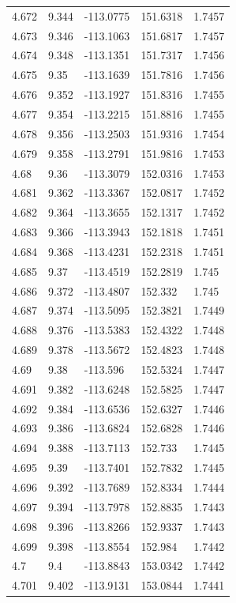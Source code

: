\begin{tabular}{lllll}
4.672 & 9.344 & -113.0775 & 151.6318 & 1.7457 \\
4.673 & 9.346 & -113.1063 & 151.6817 & 1.7457 \\
4.674 & 9.348 & -113.1351 & 151.7317 & 1.7456 \\
4.675 & 9.35 & -113.1639 & 151.7816 & 1.7456 \\
4.676 & 9.352 & -113.1927 & 151.8316 & 1.7455 \\
4.677 & 9.354 & -113.2215 & 151.8816 & 1.7455 \\
4.678 & 9.356 & -113.2503 & 151.9316 & 1.7454 \\
4.679 & 9.358 & -113.2791 & 151.9816 & 1.7453 \\
4.68 & 9.36 & -113.3079 & 152.0316 & 1.7453 \\
4.681 & 9.362 & -113.3367 & 152.0817 & 1.7452 \\
4.682 & 9.364 & -113.3655 & 152.1317 & 1.7452 \\
4.683 & 9.366 & -113.3943 & 152.1818 & 1.7451 \\
4.684 & 9.368 & -113.4231 & 152.2318 & 1.7451 \\
4.685 & 9.37 & -113.4519 & 152.2819 & 1.745 \\
4.686 & 9.372 & -113.4807 & 152.332 & 1.745 \\
4.687 & 9.374 & -113.5095 & 152.3821 & 1.7449 \\
4.688 & 9.376 & -113.5383 & 152.4322 & 1.7448 \\
4.689 & 9.378 & -113.5672 & 152.4823 & 1.7448 \\
4.69 & 9.38 & -113.596 & 152.5324 & 1.7447 \\
4.691 & 9.382 & -113.6248 & 152.5825 & 1.7447 \\
4.692 & 9.384 & -113.6536 & 152.6327 & 1.7446 \\
4.693 & 9.386 & -113.6824 & 152.6828 & 1.7446 \\
4.694 & 9.388 & -113.7113 & 152.733 & 1.7445 \\
4.695 & 9.39 & -113.7401 & 152.7832 & 1.7445 \\
4.696 & 9.392 & -113.7689 & 152.8334 & 1.7444 \\
4.697 & 9.394 & -113.7978 & 152.8835 & 1.7443 \\
4.698 & 9.396 & -113.8266 & 152.9337 & 1.7443 \\
4.699 & 9.398 & -113.8554 & 152.984 & 1.7442 \\
4.7 & 9.4 & -113.8843 & 153.0342 & 1.7442 \\
4.701 & 9.402 & -113.9131 & 153.0844 & 1.7441 \\

\end{tabular}
